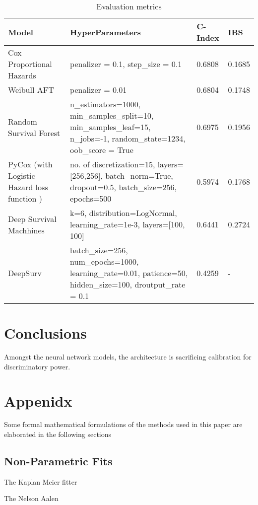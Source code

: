 \documentclass[%
 reprint,
 amsmath,amssymb,
 aps,
]{revtex4-2}
\begin{document}
\begin{table*}[t]
  \centering
  \begin{tabular}{|p{4cm}|p{6cm}|p{2cm}|p{2cm}|}
     \hline
    \textbf{Model} & \textbf{HyperParameters} & \textbf{C-Index} & \textbf{IBS} \\
    \hline
    Cox Proportional Hazards & penalizer = 0.1, step\_size = 0.1 & 0.6808 & 0.1685\\
    \hline
    Weibull AFT & penalizer = 0.01  & 0.6804 & 0.1748\\
    \hline
    Random Survival Forest & n\_estimators=1000, min\_samples\_split=10, min\_samples\_leaf=15, n\_jobs=-1, random\_state=1234, oob\_score = True  & 0.6975 & 0.1956\\
    \hline
    PyCox (with Logistic Hazard loss function \cite{kvamme_continuous_2019}) & no. of discretization=15, layers=[256,256],  batch\_norm=True, dropout=0.5, batch\_size=256, epochs=500 & 0.5974 & 0.1768\\
    \hline
    Deep Survival Machhines & k=6, distribution=LogNormal, learning\_rate=1e-3, layers=[100, 100] & 0.6441 & 0.2724\\
    \hline
    DeepSurv & batch\_size=256, num\_epochs=1000, learning\_rate=0.01, patience=50, hidden\_size=100, 
droutput\_rate = 0.1 & 0.4259 & - \\
    \hline
  \end{tabular}
  \caption{Evaluation metrics}
  \label{tab:eval}
\end{table*}


\section{\label{conc}Conclusions}
Amongst the neural network models, the architecture is sacrificing calibration for discriminatory power.

\cite{*}


\appendix

\section{\label{appdx}Appenidx}

Some formal mathematical formulations of the methods used in this paper are elaborated in the following sections
\subsection{\label{non_param}Non-Parametric Fits}
The Kaplan Meier fitter

The Nelson Aalen
\end{document}
